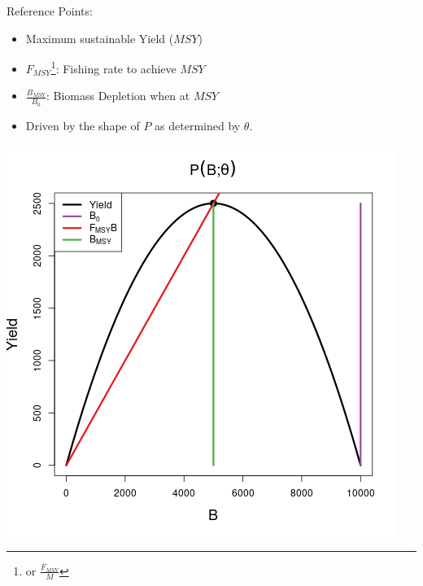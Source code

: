 \documentclass[ xcolor = pdftex, dvipsnames, table ]{beamer}
\begin{document}
%
\begin{frame}
\begin{minipage}[h!]{0.49\textwidth}
	Reference Points:
	\begin{itemize}
	\setlength{\itemsep}{5mm}
	\item Maximum sustainable Yield ($MSY$)
	\item $F_{MSY}$\footnote{or $\frac{F_{MSY}}{M}$}: Fishing rate to achieve $MSY$
	\item $\frac{B_{MSY}}{B_0}$: Biomass Depletion when at $MSY$
	\item Driven by the shape of $P$ as determined by $\theta$.
	\end{itemize}
\end{minipage}
\begin{minipage}[h!]{0.49\textwidth}
	\hspace{0.5cm}
	\includegraphics[width=\textwidth]{../../advance/plots/yieldRPplusP.png}
\end{minipage}
\end{frame}
\end{document}
